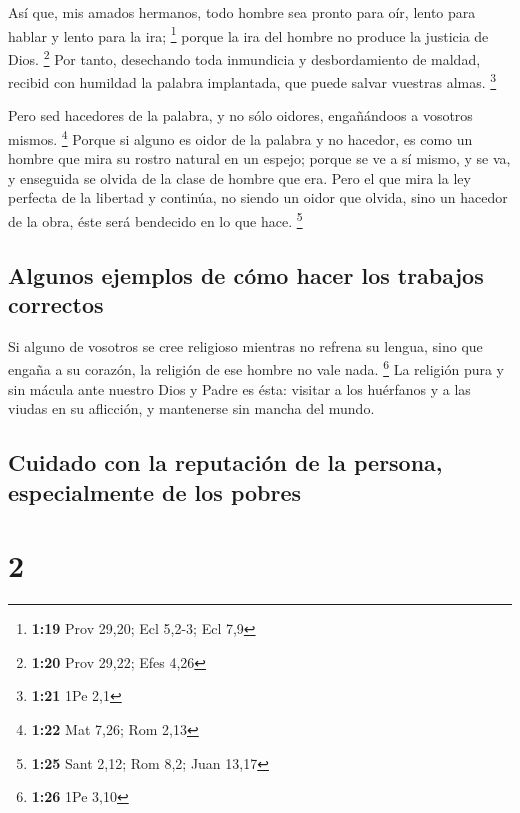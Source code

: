  Así que, mis amados hermanos, todo hombre sea pronto
para oír, lento para hablar y lento para la ira; \footnote{\textbf{1:19}
  Prov 29,20; Ecl 5,2-3; Ecl 7,9}  porque la ira del
hombre no produce la justicia de Dios. \footnote{\textbf{1:20} Prov
  29,22; Efes 4,26}  Por tanto, desechando toda
inmundicia y desbordamiento de maldad, recibid con humildad la palabra
implantada, que puede salvar vuestras almas. \footnote{\textbf{1:21} 1Pe
  2,1}

 Pero sed hacedores de la palabra, y no sólo oidores,
engañándoos a vosotros mismos. \footnote{\textbf{1:22} Mat 7,26; Rom
  2,13}  Porque si alguno es oidor de la palabra y no
hacedor, es como un hombre que mira su rostro natural en un espejo;
 porque se ve a sí mismo, y se va, y enseguida se olvida
de la clase de hombre que era.  Pero el que mira la ley
perfecta de la libertad y continúa, no siendo un oidor que olvida, sino
un hacedor de la obra, éste será bendecido en lo que hace. \footnote{\textbf{1:25}
  Sant 2,12; Rom 8,2; Juan 13,17}

\hypertarget{algunos-ejemplos-de-cuxf3mo-hacer-los-trabajos-correctos}{%
\subsection{Algunos ejemplos de cómo hacer los trabajos
correctos}\label{algunos-ejemplos-de-cuxf3mo-hacer-los-trabajos-correctos}}

 Si alguno de vosotros se cree religioso mientras no
refrena su lengua, sino que engaña a su corazón, la religión de ese
hombre no vale nada. \footnote{\textbf{1:26} 1Pe 3,10} 
La religión pura y sin mácula ante nuestro Dios y Padre es ésta: visitar
a los huérfanos y a las viudas en su aflicción, y mantenerse sin mancha
del mundo.

\hypertarget{cuidado-con-la-reputaciuxf3n-de-la-persona-especialmente-de-los-pobres}{%
\subsection{Cuidado con la reputación de la persona, especialmente de
los
pobres}\label{cuidado-con-la-reputaciuxf3n-de-la-persona-especialmente-de-los-pobres}}

\hypertarget{section-1}{%
\section{2}\label{section-1}}

